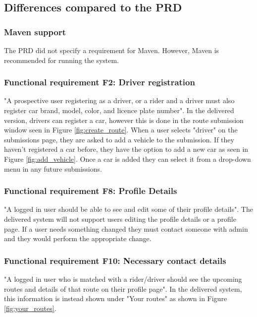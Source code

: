 \documentclass{article}
\begin{document}
\subsection{Differences compared to the PRD} %
\subsubsection{Maven support}
The PRD did not specify a requirement for Maven. However, Maven is recommended for running the system.

\subsubsection{Functional requirement F2: Driver registration}
"A prospective user registering as a driver, or a rider and a driver must also register car brand, model, color, and licence plate number"\cite{PRD}. In the delivered version, drivers can register a car, however this is done in the route submission window seen in Figure \ref{fig:create_route}. When a user selects "driver" on the submissions page, they are asked to add a vehicle to the submission. If they haven't registered a car before, they have the option to add a new car as seen in Figure \ref{fig:add_vehicle}. Once a car is added they can select it from a drop-down menu in any future submissions.

\subsubsection{Functional requirement F8: Profile Details}\label{profile_details}
"A logged in user should be able to see and edit some of their profile details"\cite{PRD}. The delivered system will not support users editing the profile details or a profile page. If a user needs something changed they must contact someone with admin and they would perform the appropriate change.

\subsubsection{Functional requirement F10: Necessary contact details}
"A logged in user who is matched with a rider/driver should see the upcoming routes and
details of that route on their profile page"\cite{PRD}. In the delivered system, this information is instead shown under "Your routes" as shown in Figure \ref{fig:your_routes}.
\end{document}
